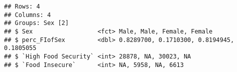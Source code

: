 \documentclass[
]{article}
\begin{document}
\begin{verbatim}
## Rows: 4
## Columns: 4
## Groups: Sex [2]
## $ Sex                  <fct> Male, Male, Female, Female
## $ perc_FIofSex         <dbl> 0.8289700, 0.1710300, 0.8194945, 0.1805055
## $ `High Food Security` <int> 28878, NA, 30023, NA
## $ `Food Insecure`      <int> NA, 5958, NA, 6613
\end{verbatim}
\end{document}
